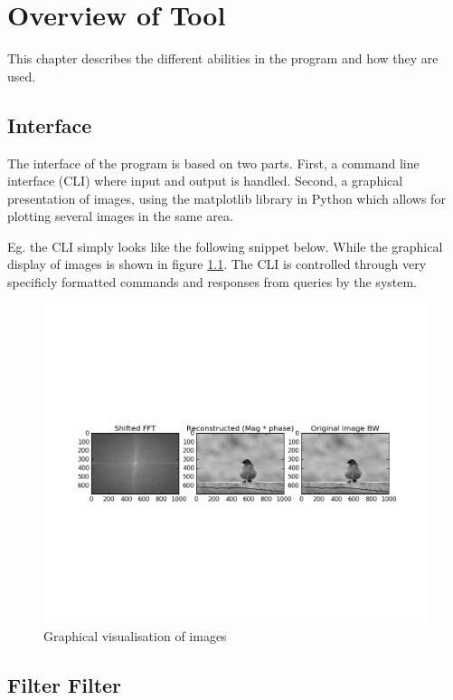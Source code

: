\chapter{Overview of Tool}\label{sec:swinstruct}
This chapter describes the different abilities in the program and how they are
used.

\section{Interface}
The interface of the program is based on two parts.  First, a command line
interface (CLI) where input and output is handled.  Second, a graphical
presentation of images, using the matplotlib library in Python which allows for
plotting several images in the same area.

Eg. the CLI simply looks like the following snippet below.  While the graphical
display of images is shown in figure \ref{fig:gui_display}.
The CLI is controlled through very specificly formatted commands and responses
from queries by the system.

\begin{figure}[h]
	\center
	\includegraphics[width={1\linewidth},trim={50px 235px 50px 230px},clip]{pics/gui_display}
	\caption{Graphical visualisation of images}\label{fig:gui_display}
\end{figure}



\section{Filter Filter}


